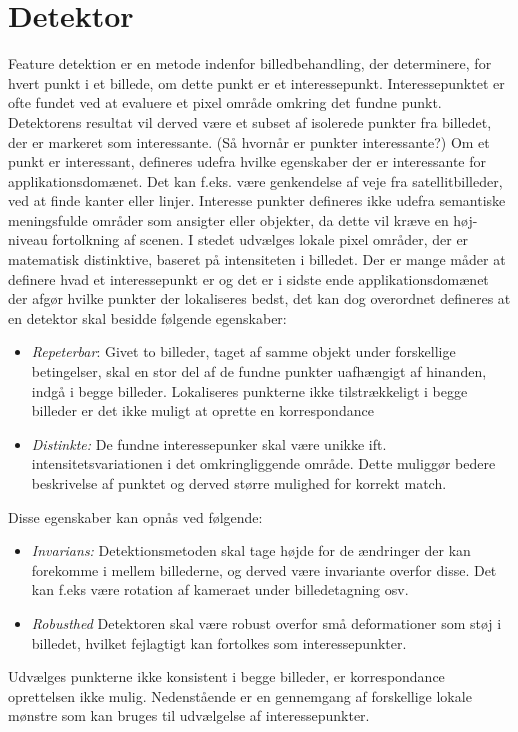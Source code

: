 \section{Detektor}
Feature detektion er en metode indenfor billedbehandling, der determinere, for hvert punkt i et billede, om dette punkt er et interessepunkt. Interessepunktet er ofte fundet ved at evaluere et pixel område omkring det fundne punkt. Detektorens resultat vil derved være et subset af isolerede punkter fra billedet, der er markeret som interessante. (Så hvornår er punkter interessante?) Om et punkt er interessant, defineres udefra hvilke egenskaber der er interessante for applikationsdomænet. Det kan f.eks. være genkendelse af veje fra satellitbilleder, ved at finde kanter eller linjer.  Interesse punkter defineres ikke udefra semantiske meningsfulde områder som ansigter eller objekter, da dette vil kræve en høj-niveau fortolkning af scenen. I stedet udvælges lokale pixel områder, der er matematisk distinktive, baseret på intensiteten i billedet. Der er mange måder at definere hvad et interessepunkt er og det er i sidste ende applikationsdomænet der afgør hvilke punkter der lokaliseres bedst, det kan dog overordnet defineres at en detektor skal besidde følgende egenskaber:
\begin{itemize}
\item{\emph{Repeterbar}: Givet to billeder, taget af samme objekt under forskellige betingelser, skal en stor  del af de fundne punkter uafhængigt af hinanden, indgå i begge billeder. Lokaliseres punkterne ikke tilstrækkeligt i begge billeder er det ikke muligt at oprette en korrespondance
}
\item{ \emph{Distinkte:}
 De fundne interessepunker skal være unikke ift. intensitetsvariationen i det omkringliggende område. Dette muliggør bedere beskrivelse af punktet og derved større mulighed for korrekt match.}
\end{itemize}
Disse egenskaber kan opnås ved følgende:
\begin{itemize}
\item{ \emph{Invarians:} Detektionsmetoden skal tage højde for de ændringer der kan forekomme i mellem billederne, og derved være invariante overfor disse. Det kan f.eks være rotation af kameraet under billedetagning osv.}
\item{ \emph{Robusthed} Detektoren skal være robust overfor små deformationer som støj i billedet, hvilket fejlagtigt kan fortolkes som interessepunkter.}
\end{itemize}
Udvælges punkterne ikke konsistent i begge billeder, er korrespondance oprettelsen ikke mulig. Nedenstående er en gennemgang af forskellige lokale mønstre som kan bruges til udvælgelse af interessepunkter.
